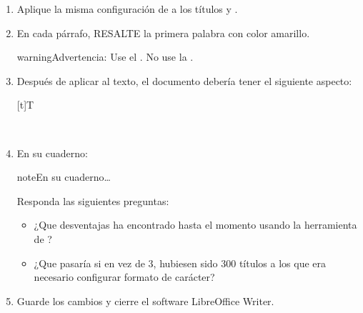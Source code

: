 \documentclass[letterpaper,10pt,spanish]{sphinxmanual}
\let\sphinxpxdimen\pdfpxdimen\else\newdimen\sphinxpxdimen
\begin{document}
\begin{enumerate}
\item {} 
\sphinxAtStartPar
Aplique la misma configuración de  a los títulos  y .

\item {} 
\sphinxAtStartPar
En cada párrafo, RESALTE la primera palabra con color amarillo.

\begin{sphinxadmonition}{warning}{Advertencia:}
\sphinxAtStartPar
Use el . No use la .
\end{sphinxadmonition}

\item {} 
\sphinxAtStartPar
Después de aplicar  al texto, el documento debería tener el siguiente aspecto:


\begin{savenotes}\sphinxattablestart
\sphinxthistablewithglobalstyle
\centering
\begin{tabulary}{\linewidth}[t]{T}
\sphinxtoprule
\sphinxtableatstartofbodyhook

\begin{sphinxfigure-in-table}
\centering

\noindent\sphinxincludegraphics[width=500\sphinxpxdimen]{{image085}.png}
\end{sphinxfigure-in-table}\relax
\\
\sphinxbottomrule
\end{tabulary}
\sphinxtableafterendhook\par
\sphinxattableend\end{savenotes}

\item {} 
\sphinxAtStartPar
En su cuaderno:

\begin{sphinxadmonition}{note}{En su cuaderno…}

\sphinxAtStartPar
Responda las siguientes preguntas:
\begin{itemize}
\item {} 
\sphinxAtStartPar
¿Que desventajas ha encontrado hasta el momento usando la herramienta de ?

\item {} 
\sphinxAtStartPar
¿Que pasaría si en vez de 3, hubiesen sido 300 títulos a los que era necesario configurar formato de carácter?

\end{itemize}
\end{sphinxadmonition}

\item {} 
\sphinxAtStartPar
Guarde los cambios y cierre el software LibreOffice Writer.

\end{enumerate}
\end{document}
